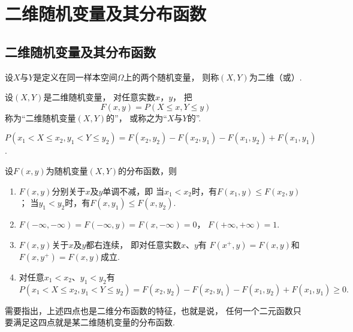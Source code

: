 \section{二维随机变量及其分布函数}
\subsection{二维随机变量及其分布函数}
\begin{definition}
设\(X\)与\(Y\)是定义在同一样本空间\(\Omega\)上的两个随机变量，
则称\((X,Y)\)为二维（或）.
\end{definition}

\begin{definition}
设\((X,Y)\)是二维随机变量，
对任意实数\(x\)，\(y\)，
把\begin{equation}\label{equation:多维随机变量及其分布.二维分布函数的定义式}
	F(x,y) = P(X \leq x, Y \leq y)
\end{equation}
称为“二维随机变量\((X,Y)\)的”，
或称之为“\(X\)与\(Y\)的”.
\end{definition}

\begin{property}
\(P(x_1 < X \leq x_2, y_1 < Y \leq y_2)
= F(x_2,y_2) - F(x_2,y_1) - F(x_1,y_2) + F(x_1,y_1)\).
\end{property}

\begin{property}
设\(F(x,y)\)为随机变量\((X,Y)\)的分布函数，则
\begin{enumerate}
	\item \(F(x,y)\)分别关于\(x\)及\(y\)单调不减，即
	当\(x_1 < x_2\)时，有\(F(x_1,y) \leq F(x_2,y)\)；
	当\(y_1 < y_2\)时，有\(F(x,y_1) \leq F(x,y_2)\).

	\item \(F(-\infty,-\infty)=F(-\infty,y)=F(x,-\infty)=0\)，
	\(F(+\infty,+\infty)=1\).

	\item \(F(x,y)\)关于\(x\)及\(y\)都右连续，
	即对任意实数\(x\)、\(y\)有
	\(F(x^+,y)=F(x,y)\)和\(F(x,y^+)=F(x,y)\)成立.

	\item 对任意\(x_1 < x_2\)、\(y_1 < y_2\)有\[
		P(x_1 < X \leq x_2, y_1 < Y \leq y_2)
		= F(x_2,y_2) - F(x_2,y_1) - F(x_1,y_2) + F(x_1,y_1)
		\geq 0.
	\]
\end{enumerate}
\end{property}

需要指出，上述四点也是二维分布函数的特征，也就是说，
任何一个二元函数只要满足这四点就是某二维随机变量的分布函数.

